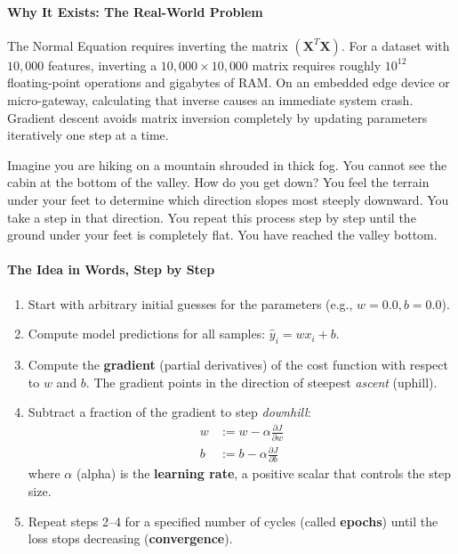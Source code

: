 \paragraph{Why It Exists: The Real-World Problem}
The Normal Equation requires inverting the matrix $(\mathbf{X}^T \mathbf{X})$. For a dataset with $10{,}000$ features, inverting a $10{,}000 \times 10{,}000$ matrix requires roughly $10^{12}$ floating-point operations and gigabytes of RAM. On an embedded edge device or micro-gateway, calculating that inverse causes an immediate system crash. Gradient descent avoids matrix inversion completely by updating parameters iteratively one step at a time.

\begin{analogy}
Imagine you are hiking on a mountain shrouded in thick fog. You cannot see the cabin at the bottom of the valley. How do you get down? You feel the terrain under your feet to determine which direction slopes most steeply downward. You take a step in that direction. You repeat this process step by step until the ground under your feet is completely flat. You have reached the valley bottom.
\end{analogy}

\paragraph{The Idea in Words, Step by Step}
\begin{enumerate}
    \item Start with arbitrary initial guesses for the parameters (e.g., $w = 0.0, b = 0.0$).
    \item Compute model predictions for all samples: $\hat{y}_i = w x_i + b$.
    \item Compute the \textbf{gradient} (partial derivatives) of the cost function with respect to $w$ and $b$. The gradient points in the direction of steepest \textit{ascent} (uphill).
    \item Subtract a fraction of the gradient to step \textit{downhill}:
    \begin{align}
    w &:= w - \alpha \frac{\partial J}{\partial w}\label{eq:update_w} \\
    b &:= b - \alpha \frac{\partial J}{\partial b}\label{eq:update_b}
    \end{align}
    where $\alpha$ (alpha) is the \textbf{learning rate}, a positive scalar that controls the step size.
    \item Repeat steps 2--4 for a specified number of cycles (called \textbf{epochs}) until the loss stops decreasing (\textbf{convergence}).
\end{enumerate}

